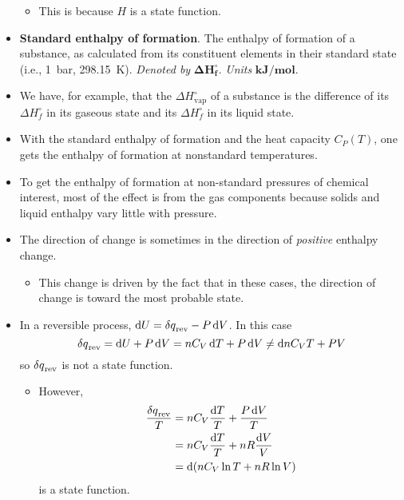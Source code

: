 \documentclass[../notes.tex]{subfiles}
\begin{document}
\begin{itemize}
\begin{itemize}
        \item This is because $H$ is a state function.
    \end{itemize}
    \item \textbf{Standard enthalpy of formation}. The enthalpy of formation of a substance, as calculated from its constituent elements in their standard state (i.e., \SI{1}{\bar}, \SI{298.15}{\kelvin}). \emph{Denoted by} $\bm{\Delta H_f^\circ}$. \emph{Units} $\textbf{kJ}\bm{/}\textbf{mol}$.
    \item We have, for example, that the $\Delta H_\text{vap}^\circ$ of a substance is the difference of its $\Delta H_f^\circ$ in its gaseous state and its $\Delta H_f^\circ$ in its liquid state.
    \item With the standard enthalpy of formation and the heat capacity $C_P(T)$, one gets the enthalpy of formation at nonstandard temperatures.
    \item To get the enthalpy of formation at non-standard pressures of chemical interest, most of the effect is from the gas components because solids and liquid enthalpy vary little with pressure.
    \item The direction of change is sometimes in the direction of \emph{positive} enthalpy change.
    \begin{itemize}
        \item This change is driven by the fact that in these cases, the direction of change is toward the most probable state.
    \end{itemize}
    \item In a reversible process, $\dd{U}=\var{q}_\text{rev}-P\dd{V}$. In this case
    \begin{equation*}
        \var{q}_\text{rev} = \dd{U}+P\dd{V} = nC_V\dd{T}+P\dd{V} \neq \dd{nC_VT+PV}
    \end{equation*}
    so $\var{q}_\text{rev}$ is not a state function.
    \begin{itemize}
        \item However,
        \begin{align*}
            \frac{\var{q}_\text{rev}}{T} &= nC_V\frac{\dd{T}}{T}+\frac{P\dd{V}}{T}\\
            &= nC_V\frac{\dd{T}}{T}+nR\frac{\dd{V}}{V}\\
            &= \dd{(nC_V\ln T+nR\ln V)}
        \end{align*}
        is a state function.
    \end{itemize}
\end{itemize}
\end{document}
